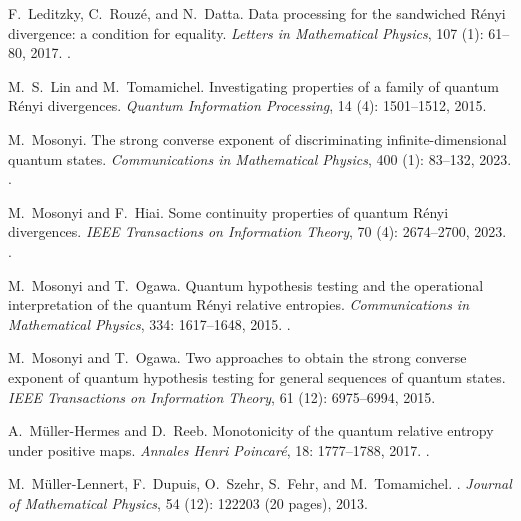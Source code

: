 \documentclass[12pt]{article}
\theoremstyle{definition}
\theoremstyle{remark}
\numberwithin{equation}{section}
\begin{document}
\begin{thebibliography}{27}
F.~Leditzky, C.~Rouz{\'e}, and N.~Datta.
\newblock Data processing for the sandwiched {R}{\'e}nyi divergence: a
  condition for equality.
\newblock \emph{Letters in Mathematical Physics}, 107 (1):
  61--80, 2017.
\newblock {}.

M.~S.~Lin and M.~Tomamichel.
\newblock Investigating properties of a family of quantum R\'enyi divergences.
\newblock \emph{Quantum Information Processing}, 14
 (4): 1501--1512, 2015.

M.~Mosonyi.
\newblock The strong converse exponent of discriminating infinite-dimensional
  quantum states.
\newblock \emph{Communications in Mathematical Physics}, 400
  (1): 83--132, 2023.
\newblock {}.

M.~Mosonyi and F.~Hiai.
\newblock Some continuity properties of quantum {R}\'enyi divergences.
\newblock \emph{IEEE Transactions on Information Theory}, 70 (4):
2674--2700, 2023.
\newblock {}.

M.~Mosonyi and T.~Ogawa.
\newblock Quantum hypothesis testing and the operational interpretation of the quantum
R\'enyi relative entropies.
\newblock \emph{Communications in Mathematical Physics}, 334: 1617--1648, 2015.
\newblock {}.

M.~Mosonyi and T.~Ogawa.
\newblock Two approaches to obtain the strong converse exponent of quantum
hypothesis testing for general sequences of quantum states.
\newblock \emph{IEEE Transactions on Information Theory}, 61 (12):
6975--6994, 2015.

A.~M{\"u}ller-Hermes and D.~Reeb.
\newblock Monotonicity of the quantum relative entropy under positive maps.
\newblock \emph{Annales Henri Poincar{\'e}}, 18: 1777--1788, 2017.
\newblock {}.

M.~M{\" u}ller-Lennert, F.~Dupuis, O.~Szehr, S.~Fehr, and M.~Tomamichel.
.
\newblock \emph{Journal of Mathematical Physics}, {54} (12):
{122203} (20 pages), {2013}.


\end{thebibliography}
\end{document}
